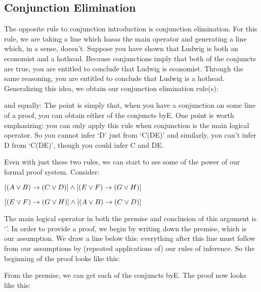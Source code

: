 \subsection{Conjunction Elimination}

The opposite rule to conjunction introduction is conjunction elimination. For this rule, we are taking a line which has\eand  as the main operator and generating a line which, in a sense, doesn't. Suppose you have shown that Ludwig is both an economist and a hothead. Because conjunctions imply that both of the conjuncts are true, you are entitled to conclude that Ludwig is economist. Through the same reasoning, you are entitled to conclude that Ludwig is a hothead. Generalizing this idea, we obtain our conjunction elimination rule(s):

and equally:
The point is simply that, when you have a conjunction on some line of a proof, you can obtain either of the conjuncts by\eand E. One point is worth emphasizing: you can only apply this rule when conjunction is the main logical operator. So you cannot infer ‘D’ just from ‘C\eor (D\eand E)’ and similarly, you can't infer D from ‘C\eand (D\eor E)’, though you could infer C and D\eor E.

Even with just these two rules, we can start to see some of the power of our formal proof system. Consider:
\begin{earg}
\item[] $[(A\vee B)\rightarrow(C\vee D)]\wedge [(E\vee F)\rightarrow (G\vee H)]$
\item[\therefore] $[(E\vee F)\rightarrow (G\vee H)]\wedge [(A\vee B)\rightarrow(C\vee D)]$
\end{earg}
The main logical operator in both the premise and conclusion of this argument is ‘\eand ’. In order to provide a proof, we begin by writing down the premise, which is our assumption. We draw a line below this: everything after this line must follow from our assumptions by (repeated applications of) our rules of inference. So the beginning of the proof looks like this:
\begin{fitchproof}
\end{fitchproof}
From the premise, we can get each of the conjuncts by\eand E. The proof now looks like this:


